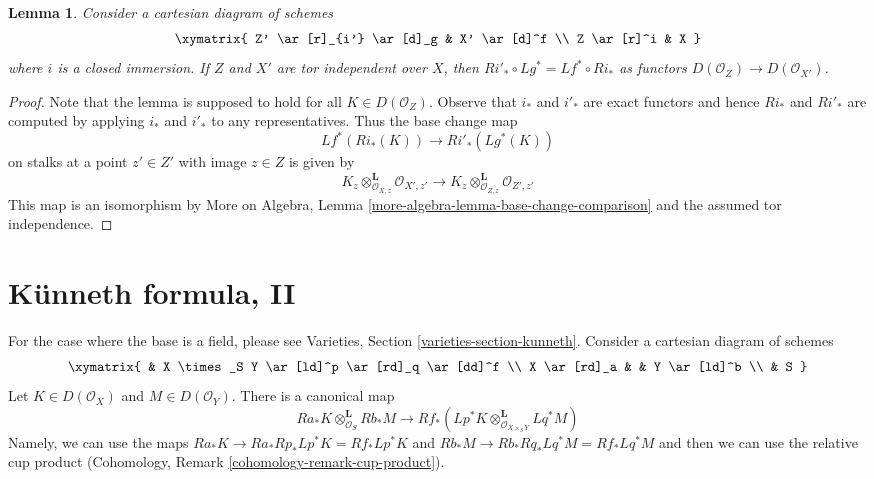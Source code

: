 \documentclass{stacks-project}
\theoremstyle{plain}
\newtheorem{lemma}[subsection]{Lemma}
\theoremstyle{definition}
\theoremstyle{remark}
\numberwithin{equation}{subsection}
\begin{document}
\begin{lemma}
\label{lemma-compare-base-change-closed-immersion}
Consider a cartesian diagram of schemes
$$
\xymatrix{
Z' \ar[r]_{i'} \ar[d]_g & X' \ar[d]^f \\
Z \ar[r]^i & X
}
$$
where $i$ is a closed immersion. If $Z$ and $X'$ are
tor independent over $X$, then $Ri'_* \circ Lg^* = Lf^* \circ Ri_*$
as functors $D(\mathcal{O}_Z) \to D(\mathcal{O}_{X'})$.
\end{lemma}

\begin{proof}
Note that the lemma is supposed to hold for all $K \in D(\mathcal{O}_Z)$.
Observe that $i_*$ and $i'_*$ are exact functors and hence
$Ri_*$ and $Ri'_*$ are computed by applying $i_*$ and $i'_*$
to any representatives. Thus the base change map
$$
Lf^*(Ri_*(K)) \longrightarrow Ri'_*(Lg^*(K))
$$
on stalks at a point $z' \in Z'$ with image $z \in Z$ is given by
$$
K_z \otimes_{\mathcal{O}_{X, z}}^\mathbf{L} \mathcal{O}_{X', z'}
\longrightarrow
K_z \otimes_{\mathcal{O}_{Z, z}}^\mathbf{L} \mathcal{O}_{Z', z'}
$$
This map is an isomorphism by
More on Algebra, Lemma \ref{more-algebra-lemma-base-change-comparison}
and the assumed tor independence.
\end{proof}








\section{K\"unneth formula, II}
\label{section-kunneth}

\noindent
For the case where the base is a field, please see
Varieties, Section \ref{varieties-section-kunneth}.
Consider a cartesian diagram of schemes
$$
\xymatrix{
& X \times_S Y \ar[ld]^p \ar[rd]_q \ar[dd]^f \\
X \ar[rd]_a & & Y \ar[ld]^b \\
& S
}
$$
Let $K \in D(\mathcal{O}_X)$ and $M \in D(\mathcal{O}_Y)$.
There is a canonical map
\begin{equation}
\label{equation-kunneth}
Ra_*K \otimes_{\mathcal{O}_S}^\mathbf{L} Rb_*M
\longrightarrow
Rf_*(Lp^*K \otimes_{\mathcal{O}_{X \times_S Y}}^\mathbf{L} Lq^*M)
\end{equation}
Namely, we can use the maps
$Ra_*K \to Ra_*Rp_* Lp^*K = Rf_*Lp^*K$ and
$Rb_*M \to Rb_*Rq_* Lq^*M = Rf_*Lq^*M$ and then we can use the
relative cup product (Cohomology, Remark \ref{cohomology-remark-cup-product}).
\end{document}
